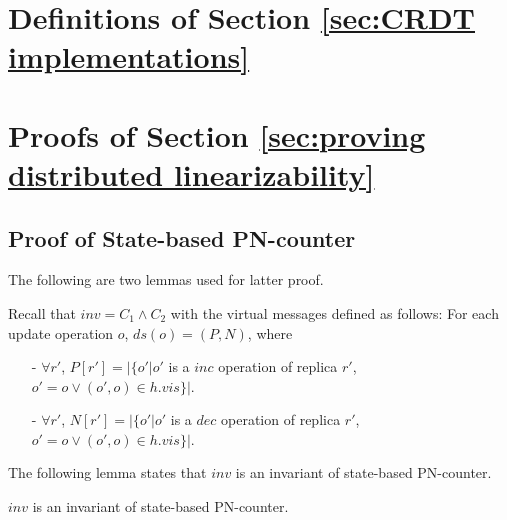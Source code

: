 \section{Definitions of Section \ref{sec:CRDT implementations}}
\label{sec:appendix definitions of section CRDT implementations}








\section{Proofs of Section \ref{sec:proving distributed linearizability}}
\label{sec:appendix proofs of section proving distributed linearizability}









\subsection{Proof of State-based PN-counter}
\label{subsec:appendix proof of state-based PN-counter}

The following are two lemmas used for latter proof. 


Recall that $\mathit{inv} = C_1 \wedge C_2$ with the virtual messages defined as follows: For each update operation $o$, $\mathit{ds}(o) = (P,N)$, where

\begin{itemize}
\setlength{\itemsep}{0.5pt}
\item[-] $\forall r'$, $P[r'] = \vert \{ o' \vert o'$ is a $\mathit{inc}$ operation of replica $r'$, $o' = o \vee (o',o) \in h.\mathit{vis} \} \vert$.

\item[-] $\forall r'$, $N[r'] = \vert \{ o' \vert o'$ is a $\mathit{dec}$ operation of replica $r'$, $o' = o \vee (o',o) \in h.\mathit{vis} \} \vert$.
\end{itemize}

The following lemma states that $\mathit{inv}$ is an invariant of state-based PN-counter.

\begin{lemma}
\label{lemma:inv is an invariant of state-based CRDT for state-based PN-counter}
$\mathit{inv}$ is an invariant of state-based PN-counter.
\end{lemma}


